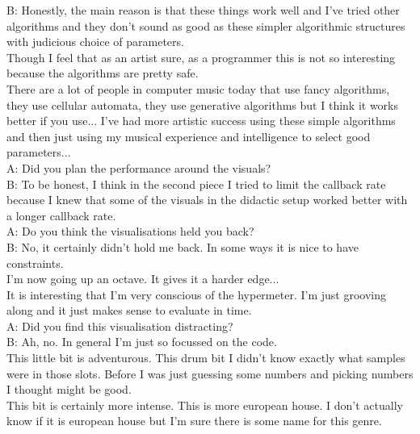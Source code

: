B: Honestly, the main reason is that these things work well and I've tried other algorithms and they don't sound as good as these simpler algorithmic structures with judicious choice of parameters.\\

Though I feel that as an artist sure, as a programmer this is not so interesting because the algorithms are pretty safe.\\

There are a lot of people in computer music today that use fancy algorithms, they use cellular automata, they use generative algorithms but I think it works better if you use... I've had more artistic success using these simple algorithms and then just using my musical experience and intelligence to select good parameters...\\

A: Did you plan the performance around the visuals?\\

B: To be honest, I think in the second piece I tried to limit the callback rate because I knew that some of the visuals in the didactic setup worked better with a longer callback rate.\\

A: Do you think the visualisations held you back?\\

B: No, it certainly didn't hold me back. In some ways it is nice to have constraints.\\

I'm now going up an octave. It gives it a harder edge...\\

It is interesting that I'm very conscious of the hypermeter. I'm just grooving along and it just makes sense to evaluate in time.\\

A: Did you find this visualisation distracting?\\

B: Ah, no. In general I'm just so focussed on the code.\\

This little bit is adventurous. This drum bit I didn't know exactly what samples were in those slots. Before I was just guessing some numbers and picking numbers I thought might be good.\\

This bit is certainly more intense. This is more european house. I don't actually know if it is european house but I'm sure there is some name for this genre.\\

